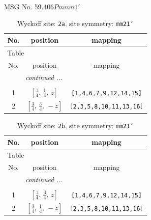 \documentclass[fleqn,8pt]{jsarticle}
\begin{document}
\setcounter{MaxMatrixCols}{32}

\renewcommand{\tablename}{Table~}
\renewcommand{\figurename}{Figure~}
\begin{center}
\LARGE
MSG No. 59.406\quad$Pmmn1'$
\end{center}
\renewcommand{\arraystretch}{1.2}
\begin{longtable}{ccc}
\caption{Wyckoff site: {\tt 2a}, site symmetry: {\tt mm21'}}
 \\
 \hline \hline
No. & position & mapping \\ \hline \endfirsthead

\multicolumn{2}{l}{\tablename\ \thetable{}} \\
 \hline \hline
No. & position & mapping \\ \hline \endhead

 \hline \hline
\multicolumn{2}{r}{\footnotesize\it continued ...} \\ \endfoot

 \hline \hline
\multicolumn{2}{r}{} \\ \endlastfoot

1 & $\left[ \frac{1}{4},\, \frac{1}{4},\, z \right]$ & {\tt [1,4,6,7,9,12,14,15]} \\ \hline
2 & $\left[ \frac{3}{4},\, \frac{3}{4},\, - z \right]$ & {\tt [2,3,5,8,10,11,13,16]} \\
\end{longtable}
\renewcommand{\arraystretch}{1.2}
\begin{longtable}{ccc}
\caption{Wyckoff site: {\tt 2b}, site symmetry: {\tt mm21'}}
 \\
 \hline \hline
No. & position & mapping \\ \hline \endfirsthead

\multicolumn{2}{l}{\tablename\ \thetable{}} \\
 \hline \hline
No. & position & mapping \\ \hline \endhead

 \hline \hline
\multicolumn{2}{r}{\footnotesize\it continued ...} \\ \endfoot

 \hline \hline
\multicolumn{2}{r}{} \\ \endlastfoot

1 & $\left[ \frac{1}{4},\, \frac{3}{4},\, z \right]$ & {\tt [1,4,6,7,9,12,14,15]} \\ \hline
2 & $\left[ \frac{3}{4},\, \frac{1}{4},\, - z \right]$ & {\tt [2,3,5,8,10,11,13,16]} \\
\end{longtable}
\end{document}
